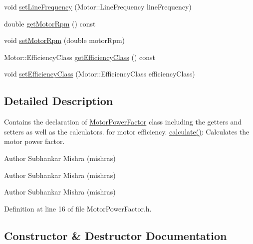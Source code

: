 \begin{DoxyCompactItemize}
void \hyperlink{class_motor_power_factor_a5186ccae4191cfc5b2b7c3bdbd166563}{set\+Line\+Frequency} (Motor\+::\+Line\+Frequency line\+Frequency)
\item 
double \hyperlink{class_motor_power_factor_acc7e144fc6c05446141cb0e07be03d70}{get\+Motor\+Rpm} () const
\item 
void \hyperlink{class_motor_power_factor_a4154bf52c6c9c9e5fb2f0985d7ae3531}{set\+Motor\+Rpm} (double motor\+Rpm)
\item 
Motor\+::\+Efficiency\+Class \hyperlink{class_motor_power_factor_a1ce98cb6ae9fbf09b05b4b6bd75e5c71}{get\+Efficiency\+Class} () const
\item 
void \hyperlink{class_motor_power_factor_add3125243d7f11131abc4e1d172ffdfc}{set\+Efficiency\+Class} (Motor\+::\+Efficiency\+Class efficiency\+Class)
\end{DoxyCompactItemize}


\subsection{Detailed Description}
Contains the declaration of \hyperlink{class_motor_power_factor}{Motor\+Power\+Factor} class including the getters and setters as well as the calculators. for motor efficiency. \hyperlink{class_motor_power_factor_ac9d5742db4a371bc4e15d5b29d335b6e}{calculate()}\+: Calculates the motor power factor. 

\begin{DoxyAuthor}{Author}
Subhankar Mishra (mishras) 
\end{DoxyAuthor}


\begin{DoxyAuthor}{Author}
Subhankar Mishra (mishras) 
\end{DoxyAuthor}


\begin{DoxyAuthor}{Author}
Subhankar Mishra (mishras) 
\end{DoxyAuthor}


Definition at line 16 of file Motor\+Power\+Factor.\+h.



\subsection{Constructor \& Destructor Documentation}
\mbox{\label{class_motor_power_factor_a1a2509240f0f759952debf47b7ef3a14}} 
